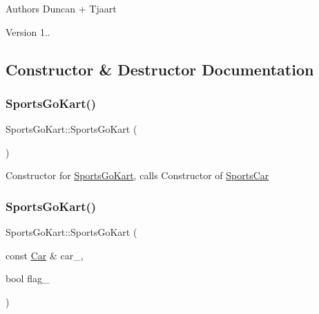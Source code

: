 \begin{DoxyAuthor}{Authors}
Duncan + Tjaart 
\end{DoxyAuthor}
\begin{DoxyVersion}{Version}
1.. 
\end{DoxyVersion}


\subsection{Constructor \& Destructor Documentation}
\mbox{\label{class_sports_go_kart_af94667e853606eda8def4ebe200e770c}} 
\subsubsection{\texorpdfstring{Sports\+Go\+Kart()}{SportsGoKart()}\hspace{0.1cm}{\footnotesize\ttfamily [1/2]}}
{\footnotesize\ttfamily Sports\+Go\+Kart\+::\+Sports\+Go\+Kart (\begin{DoxyParamCaption}{ }\end{DoxyParamCaption})\hspace{0.3cm}{\ttfamily [inline]}}

Constructor for \mbox{\hyperlink{class_sports_go_kart}{Sports\+Go\+Kart}}, calls Constructor of \mbox{\hyperlink{class_sports_car}{Sports\+Car}} \mbox{\label{class_sports_go_kart_a240ef3c603140c844f1a0fb8becd19be}} 
\subsubsection{\texorpdfstring{Sports\+Go\+Kart()}{SportsGoKart()}\hspace{0.1cm}{\footnotesize\ttfamily [2/2]}}
{\footnotesize\ttfamily Sports\+Go\+Kart\+::\+Sports\+Go\+Kart (\begin{DoxyParamCaption}\item[{const \mbox{\hyperlink{class_car}{Car}} \&}]{car\+\_\+,  }\item[{bool}]{flag\+\_\+ }\end{DoxyParamCaption})\hspace{0.3cm}{\ttfamily [inline]}}

